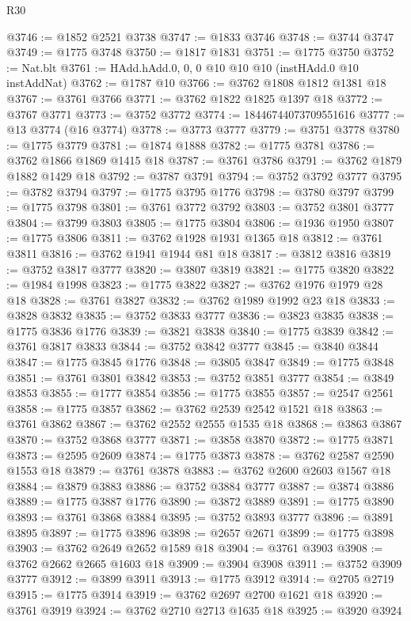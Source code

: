 \begin{lexlean}{R30}
\begin{coremodule}
@3746 := @1852 @2521 @3738
@3747 := @1833 @3746
@3748 := @3744 @3747
@3749 := @1775 @3748
@3750 := @1817 @1831
@3751 := @1775 @3750
@3752 := Nat.blt
@3761 := HAdd.hAdd.{0, 0, 0} @10 @10 @10 (instHAdd.{0} @10 instAddNat)
@3762 := @1787 @10
@3766 := @3762 @1808 @1812 @1381 @18
@3767 := @3761 @3766
@3771 := @3762 @1822 @1825 @1397 @18
@3772 := @3767 @3771
@3773 := @3752 @3772
@3774 := 18446744073709551616
@3777 := @13 @3774 (@16 @3774)
@3778 := @3773 @3777
@3779 := @3751 @3778
@3780 := @1775 @3779
@3781 := @1874 @1888
@3782 := @1775 @3781
@3786 := @3762 @1866 @1869 @1415 @18
@3787 := @3761 @3786
@3791 := @3762 @1879 @1882 @1429 @18
@3792 := @3787 @3791
@3794 := @3752 @3792 @3777
@3795 := @3782 @3794
@3797 := @1775 @3795 @1776
@3798 := @3780 @3797
@3799 := @1775 @3798
@3801 := @3761 @3772 @3792
@3803 := @3752 @3801 @3777
@3804 := @3799 @3803
@3805 := @1775 @3804
@3806 := @1936 @1950
@3807 := @1775 @3806
@3811 := @3762 @1928 @1931 @1365 @18
@3812 := @3761 @3811
@3816 := @3762 @1941 @1944 @81 @18
@3817 := @3812 @3816
@3819 := @3752 @3817 @3777
@3820 := @3807 @3819
@3821 := @1775 @3820
@3822 := @1984 @1998
@3823 := @1775 @3822
@3827 := @3762 @1976 @1979 @28 @18
@3828 := @3761 @3827
@3832 := @3762 @1989 @1992 @23 @18
@3833 := @3828 @3832
@3835 := @3752 @3833 @3777
@3836 := @3823 @3835
@3838 := @1775 @3836 @1776
@3839 := @3821 @3838
@3840 := @1775 @3839
@3842 := @3761 @3817 @3833
@3844 := @3752 @3842 @3777
@3845 := @3840 @3844
@3847 := @1775 @3845 @1776
@3848 := @3805 @3847
@3849 := @1775 @3848
@3851 := @3761 @3801 @3842
@3853 := @3752 @3851 @3777
@3854 := @3849 @3853
@3855 := @1777 @3854
@3856 := @1775 @3855
@3857 := @2547 @2561
@3858 := @1775 @3857
@3862 := @3762 @2539 @2542 @1521 @18
@3863 := @3761 @3862
@3867 := @3762 @2552 @2555 @1535 @18
@3868 := @3863 @3867
@3870 := @3752 @3868 @3777
@3871 := @3858 @3870
@3872 := @1775 @3871
@3873 := @2595 @2609
@3874 := @1775 @3873
@3878 := @3762 @2587 @2590 @1553 @18
@3879 := @3761 @3878
@3883 := @3762 @2600 @2603 @1567 @18
@3884 := @3879 @3883
@3886 := @3752 @3884 @3777
@3887 := @3874 @3886
@3889 := @1775 @3887 @1776
@3890 := @3872 @3889
@3891 := @1775 @3890
@3893 := @3761 @3868 @3884
@3895 := @3752 @3893 @3777
@3896 := @3891 @3895
@3897 := @1775 @3896
@3898 := @2657 @2671
@3899 := @1775 @3898
@3903 := @3762 @2649 @2652 @1589 @18
@3904 := @3761 @3903
@3908 := @3762 @2662 @2665 @1603 @18
@3909 := @3904 @3908
@3911 := @3752 @3909 @3777
@3912 := @3899 @3911
@3913 := @1775 @3912
@3914 := @2705 @2719
@3915 := @1775 @3914
@3919 := @3762 @2697 @2700 @1621 @18
@3920 := @3761 @3919
@3924 := @3762 @2710 @2713 @1635 @18
@3925 := @3920 @3924

\end{coremodule}
\end{lexlean}
